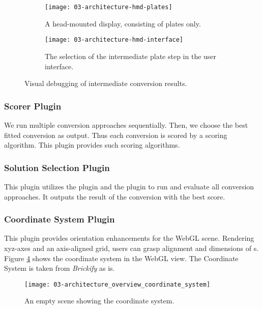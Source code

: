 \documentclass[../../ClassicThesis.tex]{subfiles}
\begin{document}
\begin{figure}[h]
  \centering
  \begin{subfigure}[a]{0.48\textwidth}
    \texttt{[image: 03-architecture-hmd-plates]}
    \caption{A head-mounted display, consisting of plates only.}
    \label{fig:steps:plate}
  \end{subfigure}
  \begin{subfigure}[b]{0.48\textwidth}
    \texttt{[image: 03-architecture-hmd-interface]}
    \caption{The selection of the intermediate plate step in
      the user interface.}
    \label{fig:steps:ui}
  \end{subfigure}
  \label{fig:steps}
  \caption{Visual debugging of intermediate conversion results.}
\end{figure}

\subsubsection{Scorer Plugin}

We run multiple conversion approaches sequentially. Then, we choose
the best fitted conversion as output. Thus each conversion
is scored by a scoring algorithm. This
plugin provides such scoring algorithms.

\subsubsection{Solution Selection Plugin}

This plugin utilizes the  plugin and
the  plugin to run and evaluate all conversion
approaches. It outputs the result of the conversion with the
best score.

\subsubsection{Coordinate System Plugin}

This plugin provides orientation enhancements for the WebGL
scene. Rendering xyz-axes and an axis-aligned grid, users
can grasp alignment and dimensions of {\threedmodel}s.
Figure \ref{fig:architecture_overview_coordinate_system}
shows the coordinate system in the WebGL view. The
Coordinate System is taken from \emph{Brickify} as
is\cite[p.~92]{bachelor-thesis}.

\begin{figure}
  \texttt{[image: 03-architecture\_overview\_coordinate\_system]}
  \caption{An empty scene showing the coordinate system.}
  \label{fig:architecture_overview_coordinate_system}
\end{figure}
\end{document}
